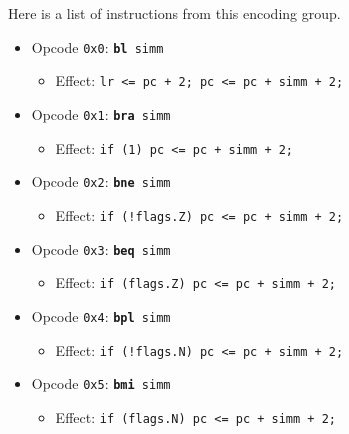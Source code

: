 \documentclass{article}
\begin{document}
	Here is a list of instructions from this encoding group.

	\singlespacing
	\begin{itemize}
		\item Opcode \texttt{0x0}:
			\texttt{\textbf{bl} simm}
		\begin{itemize}
			\item Effect:
				\texttt{lr <= pc + 2; pc <= pc + simm + 2;}
		\end{itemize}

		\item Opcode \texttt{0x1}:
			\texttt{\textbf{bra} simm}
		\begin{itemize}
			\item Effect:
				\texttt{if (1) pc <= pc + simm + 2;}
		\end{itemize}

		\item Opcode \texttt{0x2}:
			\texttt{\textbf{bne} simm}
		\begin{itemize}
			\item Effect:
				\texttt{if (!flags.Z) pc <= pc + simm + 2;}
		\end{itemize}

		\item Opcode \texttt{0x3}:
			\texttt{\textbf{beq} simm}
		\begin{itemize}
			\item Effect:
				\texttt{if (flags.Z) pc <= pc + simm + 2;}
		\end{itemize}

		\item Opcode \texttt{0x4}:
			\texttt{\textbf{bpl} simm}
		\begin{itemize}
			\item Effect:
				\texttt{if (!flags.N) pc <= pc + simm + 2;}
		\end{itemize}

		\item Opcode \texttt{0x5}:
			\texttt{\textbf{bmi} simm}
		\begin{itemize}
			\item Effect:
				\texttt{if (flags.N) pc <= pc + simm + 2;}
		\end{itemize}


\end{itemize}
\end{document}
